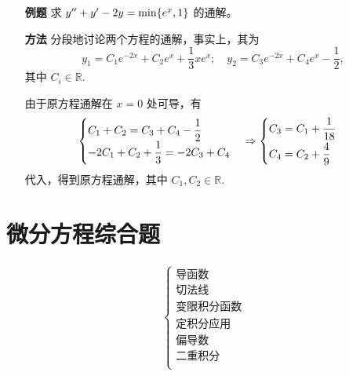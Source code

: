 
\begin{enumerate}
    \item[\textbf{例题}] 求 $ y^{\prime\prime} + y' - 2y = \min\{e^x,1\} $ 的通解。
    \item[\textbf{方法}] 分段地讨论两个方程的通解，事实上，其为
    $$
        y_1 = C_1e^{-2x} + C_2e^x + \dfrac{1}{3}xe^x;\quad{}y_2 = C_3e^{-2x} + C_4e^x - \dfrac{1}{2},
    $$
    其中 $ C_i\in\mathbb{R}. $ 

    由于原方程通解在 $ x = 0 $ 处可导，有
    \begin{equation*}
        \begin{aligned}
            \begin{cases}
                C_1 + C_2 = C_3 + C_4 - \dfrac{1}{2}\\     
                -2C_1 + C_2 + \dfrac{1}{3} = -2C_3 + C_4
            \end{cases} \Rightarrow
            \begin{cases}
                C_3 = C_1 + \dfrac{1}{18}\vspace{3pt}\\
                C_4 = C_2 + \dfrac{4}{9}
            \end{cases}
        \end{aligned}
    \end{equation*}
    代入，得到原方程通解，其中 $ C_1,C_2 \in \mathbb{R}. $ 
\end{enumerate}

\section{微分方程综合题}

\begin{equation*}
    \begin{aligned}
        \begin{cases}
            \textrm{导函数}\\
            \textrm{切法线}\\
            \textrm{变限积分函数}\\
            \textrm{定积分应用}\\
            \textrm{偏导数}\\
            \textrm{二重积分}\\
        \end{cases}
    \end{aligned}
\end{equation*}

